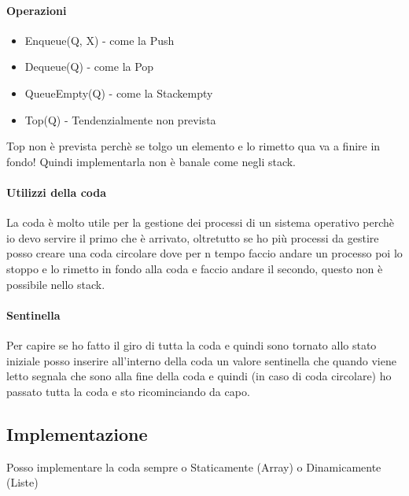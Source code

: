 \paragraph*{Operazioni}
\begin{itemize}
    \item Enqueue(Q, X) - come la Push
    \item Dequeue(Q) - come la Pop
    \item QueueEmpty(Q) - come la Stackempty
    \item Top(Q) - Tendenzialmente non prevista
\end{itemize}
Top non è prevista perchè se tolgo un elemento e lo rimetto qua va a finire in fondo!
Quindi implementarla non è banale come negli stack.\\
\paragraph*{Utilizzi della coda} La coda è molto utile per la gestione dei processi
di un sistema operativo perchè io devo servire il primo che è arrivato, oltretutto
se ho più processi da gestire posso creare una coda circolare dove per n tempo faccio
andare un processo poi lo stoppo e lo rimetto in fondo alla coda e faccio andare il secondo,
questo non è possibile nello stack.
\paragraph*{Sentinella} Per capire se ho fatto il giro di tutta la coda e quindi sono
tornato allo stato iniziale posso inserire all'interno della coda un valore sentinella che
quando viene letto segnala che sono alla fine della coda e quindi (in caso di coda circolare)
ho passato tutta la coda e sto ricominciando da capo.
\subsection{Implementazione}
Posso implementare la coda sempre o Staticamente (Array) o Dinamicamente (Liste)

